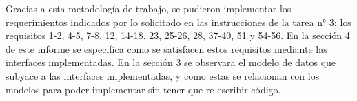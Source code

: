 Gracias a esta metodología de trabajo, se pudieron implementar los requerimientos indicados por lo solicitado en las instrucciones de la tarea n° 3: los requisitos 1-2, 4-5, 7-8, 12, 14-18, 23, 25-26, 28, 37-40, 51 y 54-56. En la sección 4 de este informe se especifíca como se satisfacen estos requisitos mediante las interfaces implementadas. En la sección 3 se observara el modelo de datos que subyace a las interfaces implementadas, y como estas se relacionan con los modelos para poder implementar sin tener que re-escribir código. 